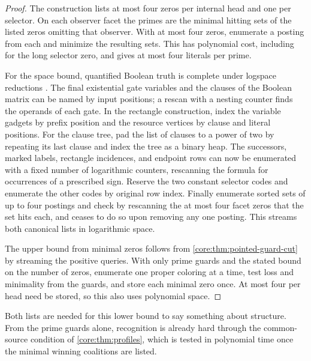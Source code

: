 \begin{proof}
The construction lists at most four zeros per internal head and
one per selector. On each observer facet the primes are the minimal
hitting sets of the listed zeros omitting that observer. With at
most four zeros, enumerate a posting from each and minimize the
resulting sets. This has polynomial cost, including for the long
selector zero, and gives at most four literals per prime.

For the space bound, quantified Boolean truth is complete under
logspace reductions \cite[Theorem~4.3]{StockmeyerMeyer1973}.
The final existential gate variables and the clauses of the Boolean
matrix can be named by input positions; a rescan with a nesting
counter finds the operands of each gate. In the rectangle construction,
index the variable gadgets by prefix position and the resource vertices
by clause and literal positions. For the clause tree, pad the list of
clauses to a power of two by repeating its last clause and index the
tree as a binary heap. The successors, marked labels, rectangle
incidences, and endpoint rows can now be enumerated with a fixed
number of logarithmic counters, rescanning the formula for occurrences
of a prescribed sign. Reserve the two constant selector codes and
enumerate the other codes by original row index.
Finally enumerate sorted sets of up to four postings and check by
rescanning the at most four facet zeros that the set hits each,
and ceases to do so upon removing any one posting. This streams both
canonical lists in logarithmic space.

The upper bound from minimal zeros follows from
\cref{core:thm:pointed-guard-cut} by streaming the positive queries.
With only prime guards and the stated bound on the number of zeros,
enumerate one proper coloring at a time, test loss and minimality
from the guards, and store each minimal zero once. At most four
per head need be stored, so this also uses polynomial space.
\end{proof}

Both lists are needed for this lower bound to say something about
structure. From the prime guards alone, recognition is already hard
through the common-source condition of \cref{core:thm:profiles}, which
is tested in polynomial time once the minimal winning coalitions are listed.

